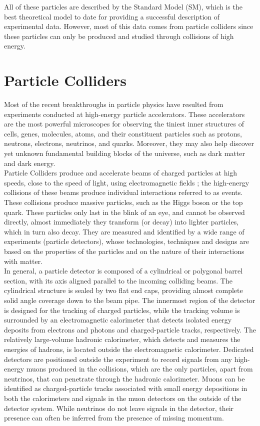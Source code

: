 All of these particles are described by the Standard Model (SM), which is the best theoretical model to date for providing a successful description of experimental data. However, most of this data comes from particle colliders since these particles can only be produced and studied through collisions of high energy.



\section{Particle Colliders}

Most of the recent breakthroughs in particle physics have resulted from experiments conducted at high-energy particle accelerators. These accelerators are the most powerful microscopes for observing the tiniest inner structures of cells, genes, molecules, atoms, and their constituent particles such as protons, neutrons, electrons, neutrinos, and quarks. Moreover, they may also help discover yet unknown fundamental building blocks of the universe, such as dark matter and dark energy.\\

Particle Colliders produce and accelerate beams of charged particles at high speeds, close to the speed of light,  using electromagnetic fields ; the high-energy collisions of these beams produce individual interactions referred to as events. These collisions produce massive particles, such as the Higgs boson or the top quark. These particles only last in the blink of an eye, and cannot be observed directly, almost immediately they transform (or decay) into lighter particles, which in turn also decay. They are measured and identified by a wide range of experiments (particle detectors), whose technologies, techniques and designs are based on the properties of the particles and on the nature of their interactions with matter.\\

In general, a particle detector is composed of a cylindrical or polygonal barrel section, with its axis aligned parallel to the incoming colliding beams. The cylindrical structure is sealed by two flat end caps, providing almost complete solid angle coverage down to the beam pipe. The innermost region of the detector is designed for the tracking of charged particles, while the tracking volume is surrounded by an electromagnetic calorimeter that detects isolated energy deposits from electrons and photons and charged-particle tracks, respectively. The relatively large-volume hadronic calorimeter, which detects and measures the energies of hadrons, is located outside the electromagnetic calorimeter. Dedicated detectors are positioned outside the experiment to record signals from any high-energy muons produced in the collisions, which are the only particles, apart from neutrinos, that can penetrate through the hadronic calorimeter. Muons can be identified as charged-particle tracks associated with small energy depositions in both the calorimeters and signals in the muon detectors on the outside of the detector system. While neutrinos do not leave signals in the detector, their presence can often be inferred from the presence of missing momentum.\\

